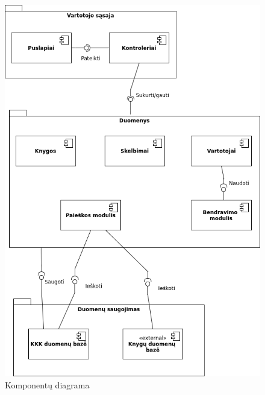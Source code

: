 \documentclass{VUMIFPSkursinis}
\begin{document}
		\begin{figure}[H]
			\centering
			\includegraphics[scale=0.8]{img/Component.png}
			\caption{Komponentų diagrama}
			\label{img:psi2-component}
		\end{figure}
\end{document}

